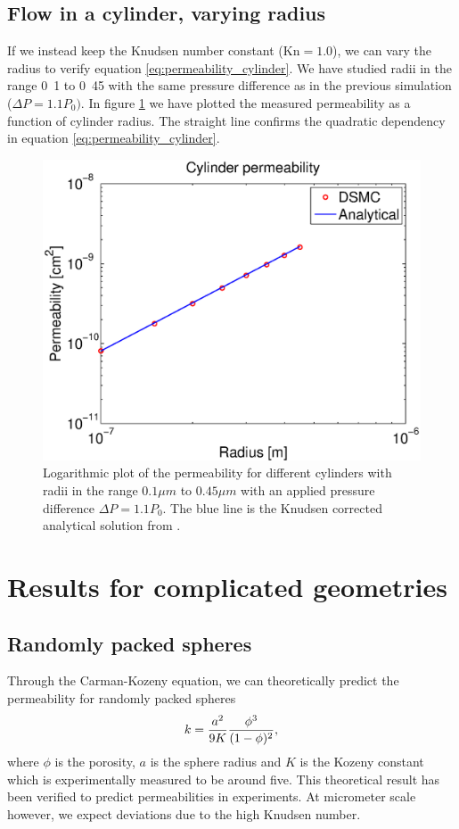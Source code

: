\subsection{Flow in a cylinder, varying radius}
If we instead keep the Knudsen number constant ($\text{Kn}=1.0$), we can vary the radius to verify equation \eqref{eq:permeability_cylinder}. We have studied radii in the range \unit{0.1}{\micro\meter} to \unit{0.45}{\micro\meter} with the same pressure difference as in the previous simulation ($\Delta P = 1.1P_0)$. In figure \ref{fig:one_cylinder_varying_radii_result} we have plotted the measured permeability as a function of cylinder radius. The straight line confirms the quadratic dependency in equation \eqref{eq:permeability_cylinder}.
\begin{figure}[h]
\begin{center}
\includegraphics[width=\textwidth, trim=0cm 0cm 0cm 0cm, clip]{DSMC/figures/cylinder_radius_permeability.eps}
\end{center}
\caption{Logarithmic plot of the permeability for different cylinders with radii in the range $0.1 \mu m$ to $0.45 \mu m$ with an applied pressure difference $\Delta P = 1.1P_0$. The blue line is the Knudsen corrected analytical solution from \cite{karniadakis2005microflows}.}
\label{fig:one_cylinder_varying_radii_result}
\end{figure}
\section{Results for complicated geometries}
\subsection{Randomly packed spheres}
Through the Carman-Kozeny equation, we can theoretically predict the permeability for randomly packed spheres 
\begin{align}
	k = {a^2 \over 9K} {\phi^3 \over (1 - \phi)^2},
\end{align}
where $\phi$ is the porosity, $a$ is the sphere radius and $K$ is the Kozeny constant which is experimentally measured to be around five\cite{carman1937fluid}. This theoretical result has been verified to predict permeabilities in experiments. At micrometer scale however, we expect deviations due to the high Knudsen number. 
